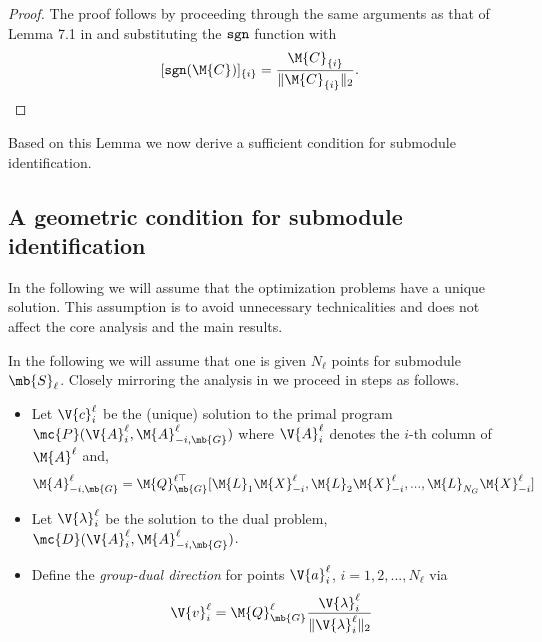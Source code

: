 \documentclass[conference]{IEEEtran}
\begin{document}
\begin{proof}
The proof follows by proceeding through the same arguments as that of Lemma 7.1 in \cite{Soltanolkotabi:2012ia} and substituting the ${\tt sgn}$ function with $$[{\tt sgn}(\M{C})]_{\{i\}} = \frac{\M{C}_{\{i\}}}{\|\M{C}_{\{i\}}\|_2}.$$
\end{proof}

Based on this Lemma we now derive a sufficient condition for submodule identification.

\subsection{A geometric condition for submodule identification}

In the following we will assume that the optimization problems have a unique solution. This assumption is to avoid unnecessary technicalities and does not affect the core analysis and the main results. 


In the following we will assume that one is given $N_\ell$ points for submodule $\mb{S}_\ell$. Closely mirroring the analysis in \cite{Soltanolkotabi:2012ia} we proceed in steps as follows.

\begin{itemize}
\item Let $\V{c}_{i}^{\ell}$ be the (unique) solution to the primal program $\mc{P}({\V{A}}_{i}^{\ell}, {\M{A}}_{-i,\mb{G}}^{\ell})$ where ${\V{A}}_{i}^{\ell}$ denotes the $i$-th column of ${\M{A}}^{\ell}$ and,
\begin{align} 
{\M{A}}_{-i,\mb{G}}^{\ell} = \M{Q}_{\mb{G}}^{\ell \top}[ \M{L}_1 \M{X}_{-i}^{\ell}, \M{L}_2 \M{X}_{-i}^{\ell},..., \M{L}_{N_G} \M{X}_{-i}^{\ell}]
\end{align}

\item Let $\V{\lambda}_i^\ell$ be the solution to the dual problem, $\mc{D}({\V{A}}_{i}^{\ell}, {\M{A}}_{-i,\mb{G}}^{\ell})$.
\item Define the \emph{group-dual direction} for points $\V{a}_{i}^{\ell}$, $i = 1,2,...,N_\ell$ via 
\begin{align}
{\V{v}}_i^\ell = \M{Q}_{\mb{G}}^{\ell} \frac{\V{\lambda}_i^\ell}{\|\V{\lambda}_i^\ell \|_2}
\end{align}
\end{itemize} 
\end{document}

